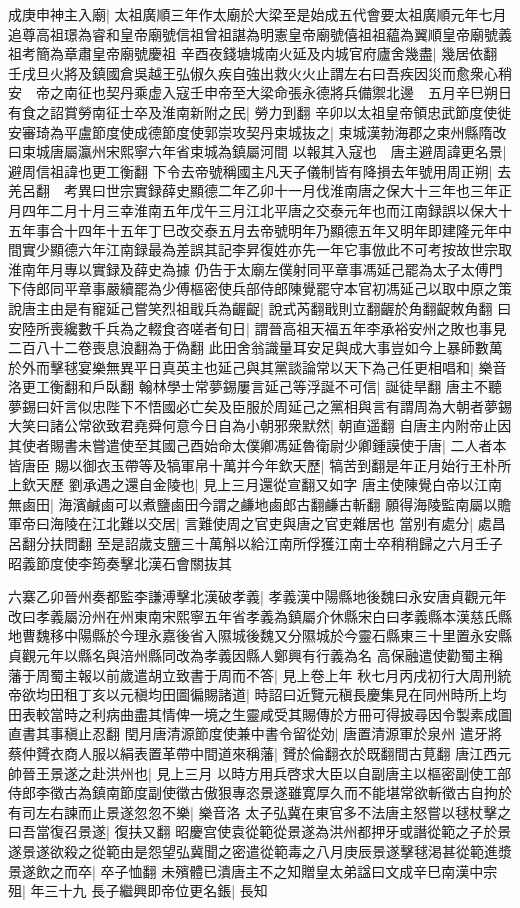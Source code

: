 成庚申神主入廟|{
	太祖廣順三年作太廟於大梁至是始成五代會要太祖廣順元年七月追尊高祖璟為睿和皇帝廟號信祖曾祖諶為明憲皇帝廟號僖祖祖藴為翼順皇帝廟號義祖考簡為章肅皇帝廟號慶祖}
辛酉夜錢塘城南火延及内城官府廬舍幾盡|{
	幾居依翻}
壬戌旦火將及鎮國倉吳越王弘俶久疾自強出救火火止謂左右曰吾疾因災而愈衆心稍安　帝之南征也契丹乘虚入寇壬申帝至大梁命張永德將兵備禦北邊　五月辛巳朔日有食之詔賞勞南征士卒及淮南新附之民|{
	勞力到翻}
辛卯以太祖皇帝領忠武節度使徙安審琦為平盧節度使成德節度使郭崇攻契丹束城抜之|{
	束城漢勃海郡之束州縣隋改曰束城唐屬瀛州宋熙寧六年省束城為鎮屬河間}
以報其入寇也　唐主避周諱更名景|{
	避周信祖諱也更工衡翻}
下令去帝號稱國主凡天子儀制皆有降損去年號用周正朔|{
	去羌呂翻　考異曰世宗實録薛史顯德二年乙卯十一月伐淮南唐之保大十三年也三年正月四年二月十月三幸淮南五年戊午三月江北平唐之交泰元年也而江南録誤以保大十五年事合十四年十五年丁巳改交泰五月去帝號明年乃顯德五年又明年即建隆元年中間實少顯德六年江南録最為差誤其記李昇復姓亦先一年它事倣此不可考按故世宗取淮南年月專以實録及薛史為據}
仍告于太廟左僕射同平章事馮延己罷為太子太傅門下侍郎同平章事嚴續罷為少傅樞密使兵部侍郎陳覺罷守本官初馮延己以取中原之策說唐主由是有寵延己嘗笑烈祖戢兵為齷齪|{
	說式芮翻戢則立翻齷於角翻齪敇角翻}
曰安陸所喪纔數千兵為之輟食咨嗟者旬日|{
	謂晉高祖天福五年李承裕安州之敗也事見二百八十二卷喪息浪翻為于偽翻}
此田舍翁識量耳安足與成大事豈如今上暴師數萬於外而擊毬宴樂無異平日真英主也延己與其黨談論常以天下為己任更相唱和|{
	樂音洛更工衡翻和戶臥翻}
翰林學士常夢錫屢言延己等浮誕不可信|{
	誕徒旱翻}
唐主不聽夢錫曰奸言似忠陛下不悟國必亡矣及臣服於周延己之黨相與言有謂周為大朝者夢錫大笑曰諸公常欲致君堯舜何意今日自為小朝邪衆默然|{
	朝直遥翻}
自唐主内附帝止因其使者賜書未嘗遣使至其國己酉始命太僕卿馮延魯衛尉少卿鍾謨使于唐|{
	二人者本皆唐臣}
賜以御衣玉帶等及犒軍帛十萬并今年欽天歷|{
	犒苦到翻是年正月始行王朴所上欽天歷}
劉承遇之還自金陵也|{
	見上三月還從宣翻又如字}
唐主使陳覺白帝以江南無鹵田|{
	海濱鹹鹵可以煮鹽鹵田今謂之鹻地鹵郎古翻鹻古斬翻}
願得海陵監南屬以贍軍帝曰海陵在江北難以交居|{
	言難使周之官吏與唐之官吏雜居也}
當别有處分|{
	處昌呂翻分扶問翻}
至是詔歲支鹽三十萬斛以給江南所俘獲江南士卒稍稍歸之六月壬子昭義節度使李筠奏擊北漢石會關抜其

六寨乙卯晉州奏都監李謙溥擊北漢破孝義|{
	孝義漢中陽縣地後魏曰永安唐貞觀元年改曰孝義屬汾州在州東南宋熙寧五年省孝義為鎮屬介休縣宋白曰孝義縣本漢慈氏縣地曹魏移中陽縣於今理永嘉後省入隰城後魏又分隰城於今靈石縣東三十里置永安縣貞觀元年以縣名與涪州縣同改為孝義因縣人鄭興有行義為名}
高保融遣使勸蜀主稱藩于周蜀主報以前歲遣胡立致書于周而不答|{
	見上卷上年}
秋七月丙戌初行大周刑統　帝欲均田租丁亥以元稹均田圖徧賜諸道|{
	時詔曰近覽元稹長慶集見在同州時所上均田表較當時之利病曲盡其情俾一境之生靈咸受其賜傳於方冊可得披尋因令製素成圖直書其事稹止忍翻}
閏月唐清源節度使兼中書令留從効|{
	唐置清源軍於泉州}
遣牙將蔡仲贇衣商人服以絹表置革帶中間道來稱藩|{
	贇於倫翻衣於既翻間古莧翻}
唐江西元帥晉王景遂之赴洪州也|{
	見上三月}
以時方用兵啓求大臣以自副唐主以樞密副使工部侍郎李徵古為鎮南節度副使徵古傲狠專恣景遂雖寛厚久而不能堪常欲斬徵古自拘於有司左右諫而止景遂忽忽不樂|{
	樂音洛}
太子弘冀在東官多不法唐主怒嘗以毬杖擊之曰吾當復召景遂|{
	復扶又翻}
昭慶宫使袁從範從景遂為洪州都押牙或譖從範之子於景遂景遂欲殺之從範由是怨望弘冀聞之密遣從範毒之八月庚辰景遂擊毬渇甚從範進漿景遂飲之而卒|{
	卒子恤翻}
未殯體已潰唐主不之知贈皇太弟諡曰文成辛巳南漢中宗殂|{
	年三十九}
長子繼興即帝位更名鋹|{
	長知}


